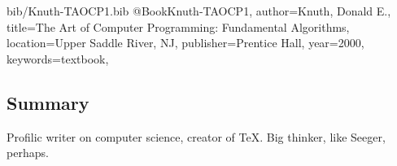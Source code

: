 
\begin{tags}
\end{tags}


\begin{filecontents*}{bib/Knuth-TAOCP1.bib}
@Book{Knuth-TAOCP1,
author={Knuth, Donald E.},
title={The Art of Computer Programming: Fundamental Algorithms},
location={Upper Saddle River, NJ},
publisher={Prentice Hall},
year={2000},
keywords={textbook},
}
\end{filecontents*}
\cite{Knuth-TAOCP1}

\subsection{Summary}
Profilic writer on computer science, creator of \TeX. 
Big thinker, like Seeger, perhaps.



